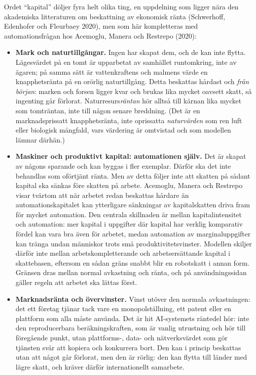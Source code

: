 \documentclass[11pt]{article}
\begin{document}
Ordet \enquote{kapital} döljer fyra helt olika ting, en uppdelning som ligger nära den akademiska litteraturen om beskattning av ekonomisk ränta (Schwerhoff, Edenhofer och Fleurbaey 2020), men som här kompletteras med automationsfrågan hos Acemoglu, Manera och Restrepo (2020):

\begin{itemize}
\item \textbf{Mark och naturtillgångar.} Ingen har skapat dem, och de kan inte flytta. Lägesvärdet på en tomt är upparbetat av samhället runtomkring, inte av ägaren; på samma sätt är vattenkraftens och malmens värde en knapphetsränta på en orörlig naturtillgång. Detta beskattas hårdast och \emph{från början}: marken och forsen ligger kvar och brukas lika mycket oavsett skatt, så ingenting går förlorat. Naturresurs\emph{räntan} hör alltså till kärnan lika mycket som tomträntan, inte till någon senare breddning. (Det är en marknadsprissatt knapphetsränta, inte oprissatta \emph{naturvärden} som ren luft eller biologisk mångfald, vars värdering är omtvistad och som modellen lämnar därhän.)
\item \textbf{Maskiner och produktivt kapital: automationen själv.} Det är skapat av någons sparande och kan byggas i fler exemplar. Därför ska det inte behandlas som oförtjänt ränta. Men av detta följer inte att skatten på sådant kapital ska sänkas före skatten på arbete. Acemoglu, Manera och Restrepo visar tvärtom att när arbetet redan beskattas hårdare än automationskapitalet kan ytterligare sänkningar av kapitalskatten driva fram för mycket automation. Den centrala skillnaden är mellan kapitalintensitet och automation: mer kapital i uppgifter där kapital har verklig komparativ fördel kan vara bra även för arbetet, medan automation av marginaluppgifter kan tränga undan människor trots små produktivitetsvinster. Modellen skiljer därför inte mellan arbetskompletterande och arbetsersättande kapital i skattebasen, eftersom en sådan gräns snabbt blir en robotskatt i annan form. Gränsen dras mellan normal avkastning och ränta, och på användningssidan gäller regeln att arbetet ska lättas först.
\item \textbf{Marknadsränta och övervinster.} Vinst utöver den normala avkastningen: det ett företag tjänar tack vare en monopol\-ställning, ett patent eller en plattform som alla måste använda. Det är hit AI-systemets räntedel hör: inte den reproducerbara beräkningskraften, som är vanlig utrustning och hör till föregående punkt, utan plattforms-, data- och nätverksvärdet som gör tjänsten svår att kopiera och konkurrera bort. Den kan i princip beskattas utan att något går förlorat, men den är rörlig: den kan flytta till länder med lägre skatt, och kräver därför internationellt samarbete.

\end{itemize}
\end{document}
